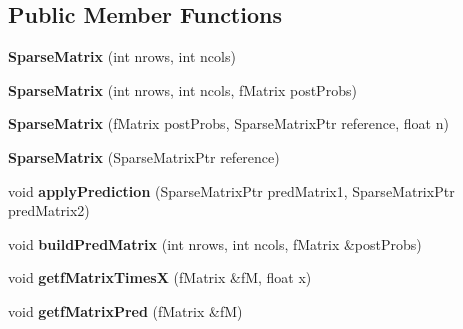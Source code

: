 \subsection*{Public Member Functions}
\begin{DoxyCompactItemize}
\item 
\mbox{\label{classtops_1_1SparseMatrix_aa061bf06bd234a131c0df349240b421a}} 
{\bfseries Sparse\+Matrix} (int nrows, int ncols)
\item 
\mbox{\label{classtops_1_1SparseMatrix_a02357da8c9692782f548b0f37a7043b4}} 
{\bfseries Sparse\+Matrix} (int nrows, int ncols, f\+Matrix post\+Probs)
\item 
\mbox{\label{classtops_1_1SparseMatrix_a2f7907516fea59264366c257bb33f148}} 
{\bfseries Sparse\+Matrix} (f\+Matrix post\+Probs, Sparse\+Matrix\+Ptr reference, float n)
\item 
\mbox{\label{classtops_1_1SparseMatrix_a4e63287ab1c9abcbf42311d0bc0b7001}} 
{\bfseries Sparse\+Matrix} (Sparse\+Matrix\+Ptr reference)
\item 
\mbox{\label{classtops_1_1SparseMatrix_afbb36d96c5bde26d33ca8ec8ef6619f6}} 
void {\bfseries apply\+Prediction} (Sparse\+Matrix\+Ptr pred\+Matrix1, Sparse\+Matrix\+Ptr pred\+Matrix2)
\item 
\mbox{\label{classtops_1_1SparseMatrix_a851a7c447d3f518f1d4b0e9159514200}} 
void {\bfseries build\+Pred\+Matrix} (int nrows, int ncols, f\+Matrix \&post\+Probs)
\item 
\mbox{\label{classtops_1_1SparseMatrix_a61d67463ba6a72b9184c35ebd883afdc}} 
void {\bfseries getf\+Matrix\+TimesX} (f\+Matrix \&fM, float x)
\item 
\mbox{\label{classtops_1_1SparseMatrix_a422c266856b81fc949490ee9f86c4eae}} 
void {\bfseries getf\+Matrix\+Pred} (f\+Matrix \&fM)
\item 
\mbox{\label{classtops_1_1SparseMatrix_a5922624524919432a4eef45125659251}} 

\end{DoxyCompactItemize}
